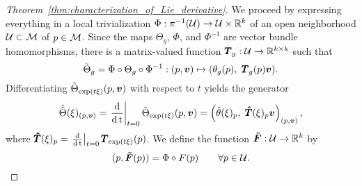 \documentclass[twoside,11pt]{article}
\begin{document}
\begin{proof}[Theorem~\ref{thm:characterization_of_Lie_derivative}]
We proceed by expressing everything in a local trivialization $\Phi:\pi^{-1}({\mathcal{U}}) \to {\mathcal{U}}\times \mathbb{R}^k$ of an open neighborhood ${\mathcal{U}}\subset {\mathcal{M}}$ of $p \in {\mathcal{M}}$.
Since the maps $\Theta_g$, $\Phi$, and $\Phi^{-1}$ are vector bundle homomorphisms, there is a matrix-valued function ${\pmb{T}}_g:{\mathcal{U}} \to \mathbb{R}^{k\times k}$ such that
\begin{equation}
    \tilde{\Theta}_g = \Phi \circ \Theta_g \circ \Phi^{-1}: 
    (p,{\boldsymbol{v}}) \mapsto (\theta_g(p), \ {\pmb{T}}_g(p){\boldsymbol{v}}).
\end{equation}
Differentiating $\tilde{\Theta}_{\exp(t\xi)}(p,{\boldsymbol{v}})$ with respect to $t$ yields the generator
\begin{equation}
    \hat{\tilde{\Theta}}(\xi)_{(p,{\boldsymbol{v}})} 
    = \left.\operatorname{\frac{\operatorname{\mathrm{d}}}{\operatorname{\mathrm{d}} t}}\right\vert_{t=0} \tilde{\Theta}_{\exp(t\xi)}(p,{\boldsymbol{v}})
    = \left(\hat{\theta}(\xi)_p, \ {\pmb{\hat{T}}}(\xi)_p {\boldsymbol{v}}\right)_{(p,{\boldsymbol{v}})},
\end{equation}
where ${\pmb{\hat{T}}}(\xi)_p = \left.\operatorname{\frac{\operatorname{\mathrm{d}}}{\operatorname{\mathrm{d}} t}}\right\vert_{t=0} {\pmb{T}}_{\exp(t\xi)}(p)$. 
We define the function ${\boldsymbol{\tilde{F}}}:{\mathcal{U}} \to \mathbb{R}^k$ by
\begin{equation}
    (p, {\boldsymbol{\tilde{F}}}(p)) = \Phi \circ F(p) \qquad \forall p\in{\mathcal{U}}.
\end{equation}


\end{proof}
\end{document}
